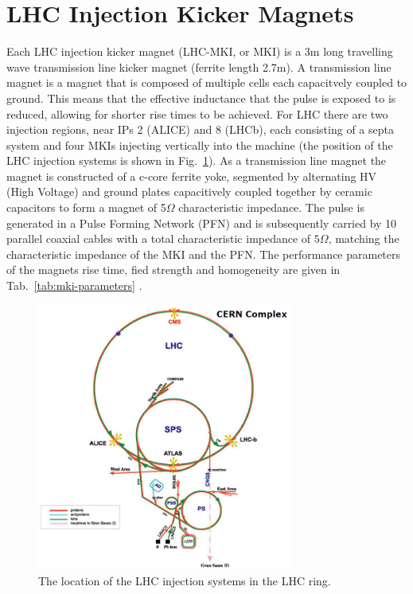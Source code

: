 \section{LHC Injection Kicker Magnets}

Each LHC injection kicker magnet (LHC-MKI, or MKI) is a 3m long travelling wave transmission line kicker magnet (ferrite length 2.7m). A transmission line magnet is a magnet that is composed of multiple cells each capacitvely coupled to ground. This means that the effective inductance that the pulse is exposed to is reduced, allowing for shorter rise times to be achieved. For LHC there are two injection regions, near IPs 2 (ALICE) and 8 (LHCb), each consisting of a septa system and four MKIs injecting vertically into the machine (the position of the LHC injection systems is shown in Fig.~\ref{fig:lhc-injection-systems}). As a transmission line magnet the magnet is constructed of a c-core ferrite yoke, segmented by alternating HV (High Voltage) and ground plates capacitively coupled together by ceramic capacitors to form a magnet of 5$\Omega$ characteristic impedance. The pulse is generated in a Pulse Forming Network (PFN) and is subsequently carried by 10 parallel coaxial cables with a total characteristic impedance of $5 \Omega$, matching the characteristic impedance of the MKI and the PFN. The performance parameters of the magnets rise time, fied strength and homogeneity are given in Tab.~\ref{tab:mki-parameters} \cite{Ducimetiere:mkiSpec}.

\begin{figure}
\begin{center}
\includegraphics[width=0.75\textwidth]{LHC_MKI/figures/injection-points-lhc.png}
\end{center}
\caption{The location of the LHC injection systems in the LHC ring.}
\label{fig:lhc-injection-systems}
\end{figure}


